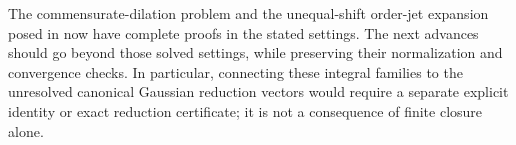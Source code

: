 The commensurate-dilation problem and the unequal-shift order-jet
expansion posed in \cite{RLC} now have complete proofs in the stated
settings. The next advances should go beyond those solved settings,
while preserving their normalization and convergence checks. In
particular, connecting these integral families to the unresolved
canonical Gaussian reduction vectors would require a separate explicit
identity or exact reduction certificate; it is not a consequence of
finite closure alone.

